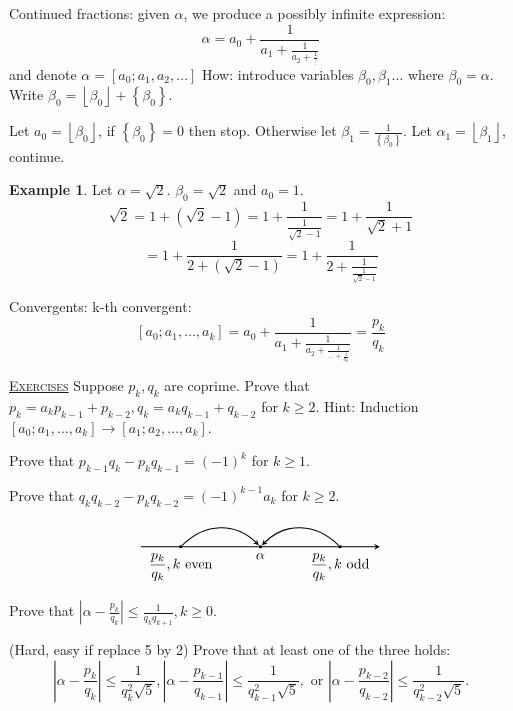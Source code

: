 \documentclass{report}
\newcommand{\floor}[1]{\left\lfloor #1 \right\rfloor}
\newcommand{\set}[1]{\left\{ #1 \right\}}
\newcommand{\fancyem}[1]{\underline{\textsc{#1}}}
\theoremstyle{definition}
\newtheorem{example}{Example}[section]
\theoremstyle{remark}
\numberwithin{equation}{section}
\begin{document}
Continued fractions: given $\alpha$, we produce a possibly infinite expression: \[
    \alpha = a_0 + \frac{1}{a_1 + \frac{1}{a_2 + \frac{1}{\vdots}}}\]
and denote $\alpha = [a_0; a_1, a_2, \ldots]$
How: introduce variables $\beta_0, \beta_1 \ldots$ where $\beta_0 = \alpha$. Write $\beta_0 = \floor{\beta_0} + \set{\beta_0}$.

Let $a_0 = \floor{\beta_0}$, if $\set{\beta_0} = 0$ then stop. Otherwise let $\beta_1 = \frac{1}{\set{\beta_0}}$. Let $\alpha_1 = \floor{\beta_1}$, continue.

\begin{example}
    Let $\alpha = \sqrt{2}$. $\beta_0 = \sqrt{2}$ and $a_0 = 1$.
    \[\sqrt{2} = 1 + (\sqrt{2} - 1) = 1 + \frac{1}{\frac{1}{\sqrt{2}-1}} = 1 + \frac{1}{\sqrt{2} + 1}\]
    \[ = 1 + \frac{1}{2 + (\sqrt{2} - 1)} = 1 + \frac{1}{2 + \frac{1}{\frac{1}{\sqrt{2} - 1}}}\]
\end{example}

Convergents:
k-th convergent: \[[a_0;a_1, \ldots, a_k] = a_0 + \frac{1}{a_1 + \frac{1}{a_2 + \frac{1}{\ldots + \frac{1}{a_k}}}} = \frac{p_k}{q_k}\]

\fancyem{Exercises} Suppose $p_k, q_k$ are coprime. Prove that $p_k = a_kp_{k-1} + p_{k-2}, q_k = a_kq_{k-1}+q_{k-2}$ for $k \geq 2$.
Hint: Induction $[a_0; a_1, \ldots, a_k] \to [a_1; a_2, \ldots, a_k]$.

Prove that $p_{k-1}q_k - p_kq_{k-1} = (-1)^k$ for $k \geq 1$.

Prove that $q_kq_{k-2} - p_kq_{k-2} = (-1)^{k-1} a_k$ for $k \geq 2$.

\[\begin{tikzpicture}
    \draw[thick, -stealth](-3,0) -> (xyz cs:x=3);
    \node[shape=rectangle, fill=black, scale = 0.3] (A1) at (0, 0) {};
        \node[below] at (A1.south) {$\alpha$};
    \node[shape=rectangle, fill=black, scale = 0.3] (A2) at (-2, 0) {};
        \node[below] at (A2.south) {$\dfrac{p_k}{q_k}, k$ even};
    \node[shape=rectangle, fill=black, scale = 0.3] (A3) at (2, 0) {};
        \node[below] at (A3.south) {$\dfrac{p_k}{q_k}, k$ odd};
    \draw[-stealth, thick] (A3) to [out=135,in=45,looseness=1.1] (A1) node[midway, above, sloped] {};
    \draw[-stealth, thick] (A2) to [out=45,in=135,looseness=1.1] (A1) node[midway, above, sloped] {};
\end{tikzpicture}\]

Prove that $\left|\alpha - \frac{p_k}{q_k}\right| \leq \frac{1}{q_kq_{k+1}}, k \geq 0$.

(Hard, easy if replace 5 by 2) Prove that at least one of the three holds:
\[\left|\alpha - \frac{p_k}{q_k}\right| \leq \frac{1}{q_k^2 \sqrt{5}}, \left|\alpha - \frac{p_{k-1}}{q_{k-1}}\right| \leq \frac{1}{q_{k-1}^2 \sqrt{5}}, \text{ or } \left|\alpha - \frac{p_{k-2}}{q_{k-2}}\right| \leq \frac{1}{q_{k-2}^2 \sqrt{5}}.\]
\end{document}
